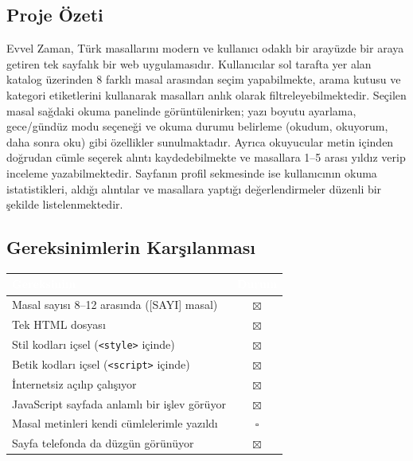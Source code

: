 \documentclass[12pt,a4paper]{article}
\begin{document}
\subsection{Proje Özeti}
Evvel Zaman, Türk masallarını modern ve kullanıcı odaklı bir arayüzde bir araya getiren tek sayfalık bir web uygulamasıdır. Kullanıcılar sol tarafta yer alan katalog üzerinden 8 farklı masal arasından seçim yapabilmekte, arama kutusu ve kategori etiketlerini kullanarak masalları anlık olarak filtreleyebilmektedir. Seçilen masal sağdaki okuma panelinde görüntülenirken; yazı boyutu ayarlama, gece/gündüz modu seçeneği ve okuma durumu belirleme (okudum, okuyorum, daha sonra oku) gibi özellikler sunulmaktadır. Ayrıca okuyucular metin içinden doğrudan cümle seçerek alıntı kaydedebilmekte ve masallara 1–5 arası yıldız verip inceleme yazabilmektedir. Sayfanın profil sekmesinde ise kullanıcının okuma istatistikleri, aldığı alıntılar ve masallara yaptığı değerlendirmeler düzenli bir şekilde listelenmektedir.

\subsection{Gereksinimlerin Karşılanması}
\begin{center}
\begin{tabular}{@{}p{8.2cm}c@{}}
\toprule
\rowcolor{ana}\textcolor{white}{\textbf{Gereksinim}} & \textcolor{white}{\textbf{Durum}} \\
\midrule
Masal sayısı 8--12 arasında ([SAYI] masal)         & $\boxtimes$ \\
Tek HTML dosyası                                    & $\boxtimes$ \\
Stil kodları içsel (\texttt{<style>} içinde)        & $\boxtimes$ \\
Betik kodları içsel (\texttt{<script>} içinde)      & $\boxtimes$ \\
İnternetsiz açılıp çalışıyor                        & $\boxtimes$ \\
JavaScript sayfada anlamlı bir işlev görüyor        & $\boxtimes$ \\
Masal metinleri kendi cümlelerimle yazıldı          & $\square$ \\
Sayfa telefonda da düzgün görünüyor                 & $\boxtimes$ \\
\bottomrule
\end{tabular}
\end{center}

\end{document}

